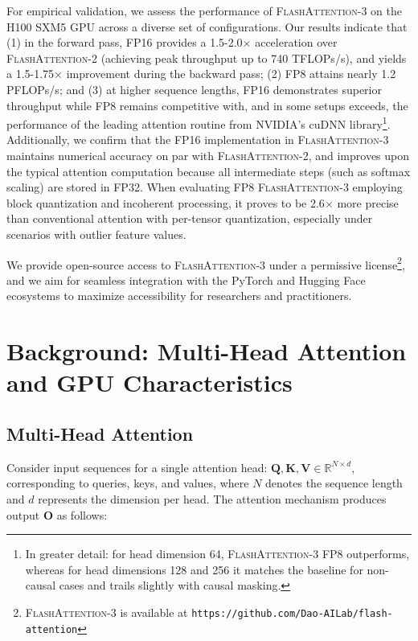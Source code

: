 For empirical validation, we assess the performance of \textsc{FlashAttention-3} on the H100 SXM5 GPU across a diverse set of configurations. Our results indicate that (1) in the forward pass, FP16 provides a 1.5-2.0$\times$ acceleration over \textsc{FlashAttention-2} (achieving peak throughput up to 740 TFLOPs/s), and yields a 1.5-1.75$\times$ improvement during the backward pass; (2) FP8 attains nearly 1.2 PFLOPs/s; and (3) at higher sequence lengths, FP16 demonstrates superior throughput while FP8 remains competitive with, and in some setups exceeds, the performance of the leading attention routine from NVIDIA's cuDNN library\footnote{In greater detail: for head dimension 64, \textsc{FlashAttention-3} FP8 outperforms, whereas for head dimensions 128 and 256 it matches the baseline for non-causal cases and trails slightly with causal masking.}. Additionally, we confirm that the FP16 implementation in \textsc{FlashAttention-3} maintains numerical accuracy on par with \textsc{FlashAttention-2}, and improves upon the typical attention computation because all intermediate steps (such as softmax scaling) are stored in FP32. When evaluating FP8 \textsc{FlashAttention-3} employing block quantization and incoherent processing, it proves to be 2.6$\times$ more precise than conventional attention with per-tensor quantization, especially under scenarios with outlier feature values.

We provide open-source access to \textsc{FlashAttention-3} under a permissive license\footnote{\textsc{FlashAttention-3} is available at \texttt{https://github.com/Dao-AILab/flash-attention}}, and we aim for seamless integration with the PyTorch and Hugging Face ecosystems to maximize accessibility for researchers and practitioners.

\section{Background: Multi-Head Attention and GPU Characteristics}
\label{sec:background}

\subsection{Multi-Head Attention}
\label{subsec:multi_head_attn}

Consider input sequences for a single attention head: $\mathbf{Q}, \mathbf{K}, \mathbf{V} \in \mathbb{R}^{N \times d}$, corresponding to queries, keys, and values, where $N$ denotes the sequence length and $d$ represents the dimension per head. The attention mechanism produces output $\mathbf{O}$ as follows:

